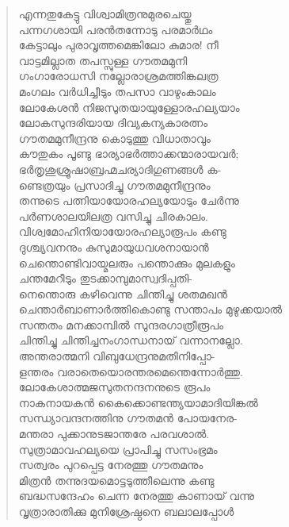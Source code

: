 \begin{verse}
എന്നതുകേട്ടു വിശ്വാമിത്രനുമുരചെയ്തു\\
പന്നഗശായി പരന്‍തന്നോടു പരമാര്‍ഥം\\
കേട്ടാലും പുരാവൃത്തമെങ്കിലോ കുമാര! നീ\\
വാട്ടമില്ലാത തപസ്സുള്ള ഗൗതമമുനി\\
ഗംഗാരോധസി നല്ലോരാശ്രമത്തിങ്കലത്ര\\
മംഗലം വര്‍ധിച്ചീടും തപസാ വാഴുംകാലം\\
ലോകേശന്‍ നിജസുതയായുള്ളോരഹല്യയാം\\
ലോകസുന്ദരിയായ ദിവ്യകന്യകാരത്നം\\
ഗൗതമമുനീന്ദ്രനു കൊടുത്തു വിധാതാവും\\
കൗതുകം പൂണ്ടു ഭാര്യാഭര്‍ത്താക്കന്മാരായവര്‍;\\
ഭര്‍തൃശുശ്രൂഷാബ്രഹ്മചര്യാദിഗുണങ്ങള്‍ ക-\\
ണ്ടെത്രയും പ്രസാദിച്ചു ഗൗതമമുനീന്ദ്രനും\\
തന്നുടെ പത്നിയായോരഹല്യയോടും ചേര്‍ന്നു\\
പര്‍ണശാലയിലത്ര വസിച്ചു ചിരകാലം.\\
വിശ്വമോഹിനിയായോരഹല്യാരൂപം കണ്ടു\\
ദുശ്ച്യവനനും കുസുമായുധവശനായാന്‍\\
ചെന്തൊണ്ടിവായ്മലരും പന്തൊക്കും മുലകളും\\
ചന്തമേറീടും തുടക്കാമ്പുമാസ്വദിപ്പതി-\\
നെന്തൊരു കഴിവെന്നു ചിന്തിച്ചു ശതമഖന്‍\\
ചെന്താര്‍ബാണാര്‍ത്തികൊണ്ടു സന്താപം മുഴുക്കയാല്‍\\
സന്തതം മനക്കാമ്പില്‍ സുന്ദരഗാത്രീരൂപം\\
ചിന്തിച്ചു ചിന്തിച്ചനംഗാന്ധനായ് വന്നാനല്ലോ.\\
അന്തരാത്മനി വിബുധേന്ദ്രനുമതിനിപ്പോ-\\
ളന്തരം വരാതെയൊരന്തരമെന്തെന്നോര്‍ത്തു.\\
ലോകേശാത്മജസുതനന്ദനനുടെ രൂപം\\
നാകനായകന്‍ കൈക്കൊണ്ടന്ത്യയാമാദിയിങ്കല്‍\\
സന്ധ്യാവന്ദനത്തിനു ഗൗതമന്‍ പോയനേര-\\
മന്തരാ പുക്കാനുടജാന്തരേ പരവശാല്‍.\\
സുത്രാമാവഹല്യയെ പ്രാപിച്ചു സസംഭ്രമം\\
സത്വരം പുറപ്പെട്ട നേരത്തു ഗൗതമനും\\
മിത്രന്‍ തന്നുദയമൊട്ടടുത്തീലെന്നു കണ്ടു\\
ബദ്ധസന്ദേഹം ചെന്ന നേരത്തു കാണായ് വന്നു\\
വൃത്രാരാതിക്കു മുനിശ്രേഷ്ഠനെ ബലാലപ്പോള്‍\\

\end{verse}
